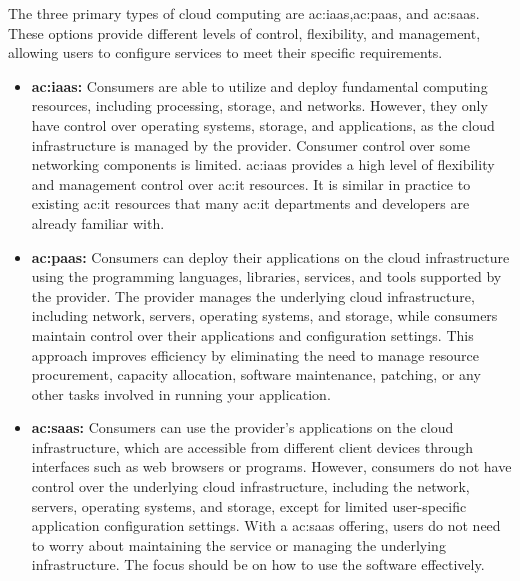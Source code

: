 The three primary types of cloud computing are \gls{ac:iaas},\gls{ac:paas}, and \gls{ac:saas}. These options provide different levels of control, flexibility, and management, allowing users to configure services to meet their specific requirements.
\begin{itemize}
    \item \textbf{\gls{ac:iaas}:} Consumers are able to utilize and deploy fundamental computing resources, including processing, storage, and networks. However, they only have control over operating systems, storage, and applications, as the cloud infrastructure is managed by the provider. Consumer control over some networking components is limited. \gls{ac:iaas} provides a high level of flexibility and management control over \gls{ac:it} resources. It is similar in practice to existing \gls{ac:it} resources that many \gls{ac:it} departments and developers are already familiar with. 
    \item \textbf{\gls{ac:paas}:} Consumers can deploy their applications on the cloud infrastructure using the programming languages, libraries, services, and tools supported by the provider. The provider manages the underlying cloud infrastructure, including network, servers, operating systems, and storage, while consumers maintain control over their applications and configuration settings. This approach improves efficiency by eliminating the need to manage resource procurement, capacity allocation, software maintenance, patching, or any other tasks involved in running your application. 
    \item \textbf{\gls{ac:saas}:} Consumers can use the provider's applications on the cloud infrastructure, which are accessible from different client devices through interfaces such as web browsers or programs. However, consumers do not have control over the underlying cloud infrastructure, including the network, servers, operating systems, and storage, except for limited user-specific application configuration settings. With a \gls{ac:saas} offering, users do not need to worry about maintaining the service or managing the underlying infrastructure. The focus should be on how to use the software effectively.
\end{itemize}

